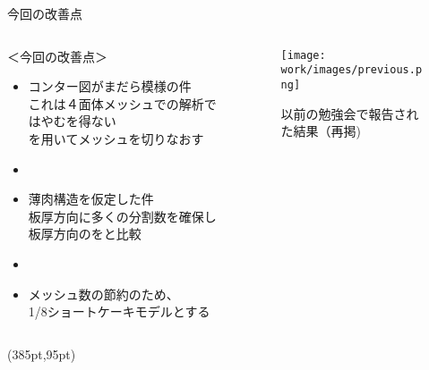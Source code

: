 \begin{frame}{今回の改善点}
 
    \begin{columns}[t]
    \begin{column}{0.7\textwidth}
        ＜今回の改善点＞ \\
         \begin{itemize}
            \item[①] コンター図がまだら模様の件 \\
                     これは４面体メッシュでの解析ではやむを得ない \\
                     を用いてメッシュを切りなおす
            \item[]
            \item[②] 薄肉構造を仮定した件 \\
                     板厚方向に多くの分割数を確保し \\
                     板厚方向のをと比較
            \item[]
            \item[③] メッシュ数の節約のため、\\
                     1/8ショートケーキモデルとする
         \end{itemize}
    \end{column}
    \begin{column}{0.3\textwidth}
      \begin{figure}[htbp]
        \begin{center}
          \texttt{[image: work/images/previous.png]}
            \caption{以前の勉強会で報告された結果（再掲)}
        \end{center}
      \end{figure}
    \end{column}
  \end{columns}
  \begin{textblock*}{30pt}(385pt,95pt)
  \end{textblock*}
\end{frame}
